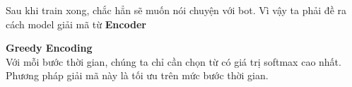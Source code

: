 Sau khi train xong, chắc hẳn sẽ muốn nói chuyện với bot. Vì vậy ta phải đề ra cách model giải mã từ \textbf{Encoder}

\textbf{Greedy Encoding} \\ [0.2rem]
Với mỗi bước thời gian, chúng ta chỉ cần chọn từ có giá trị softmax cao nhất. Phương pháp giải mã
này là tối ưu trên mức bước thời gian.